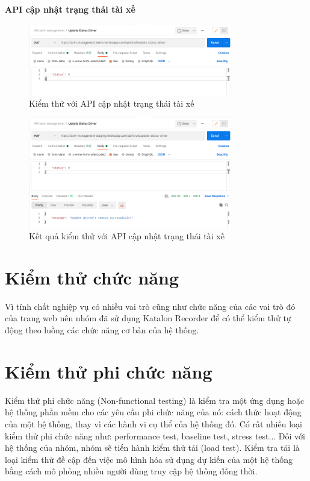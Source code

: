 		\newpage
		
		\textbf{API cập nhật trạng thái tài xế}
		
		\begin{figure}[!ht]
			\includegraphics[width=0.8\textwidth]{Images/testing/API-update-status-driver.png}
			\centering
			\linebreak
			\caption{Kiểm thử với API cập nhật trạng thái tài xế}
		\end{figure}
		
		\begin{figure}[!ht]
			\includegraphics[width=0.8\textwidth]{Images/testing/API-update-status-driver-result.png}
			\centering
			\linebreak
			\caption{Kết quả kiểm thử với API cập nhật trạng thái tài xế}
		\end{figure}
		
		\newpage
		\section{Kiểm thử chức năng}
		    Vì tính chất nghiệp vụ có nhiều vai trò cũng như chức năng của các vai trò đó của trang web nên nhóm đã sử dụng Katalon Recorder để có thể kiểm thử tự động theo luồng các chức năng cơ bản của hệ thống.
			
		\section{Kiểm thử phi chức năng}
		    Kiểm thử phi chức năng (Non-functional testing) là kiểm tra một ứng dụng hoặc hệ thống phần mềm cho các yêu cầu phi chức năng của nó: cách thức hoạt động của một hệ thống, thay vì các hành vi cụ thể của hệ thống đó. Có rất nhiều loại kiểm thử phi chức năng như: performance test, baseline test, stress test... Đối với hệ thống của nhóm, nhóm sẽ tiến hành kiểm thử tải (load test). Kiểm tra tải là loại kiểm thử đề cập đến việc mô hình hóa sử dụng dự kiến của một hệ thống bằng cách mô phỏng nhiều người dùng truy cập hệ thống đồng thời.
		    
